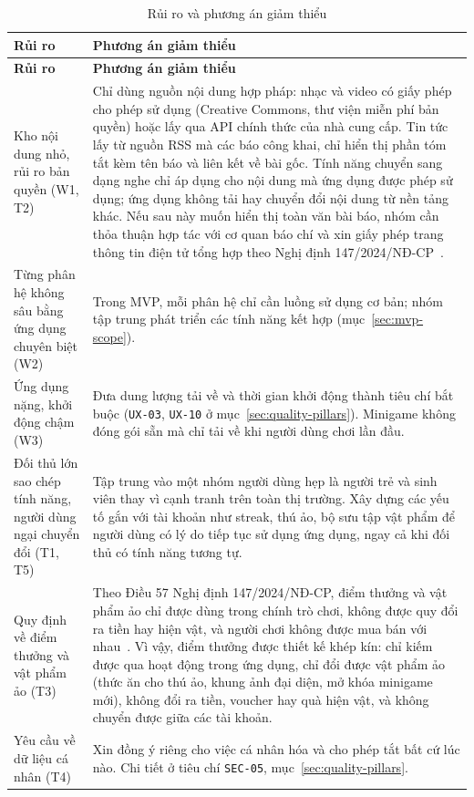 \begingroup
\small
\begin{longtable}{@{}>{\raggedright\arraybackslash}p{4.2cm}>{\raggedright\arraybackslash}p{11.2cm}@{}}
\caption{Rủi ro và phương án giảm thiểu}
\label{tab:swot-risks} \\
\toprule
\textbf{Rủi ro} & \textbf{Phương án giảm thiểu} \\
\midrule
\endfirsthead
\toprule
\textbf{Rủi ro} & \textbf{Phương án giảm thiểu} \\
\midrule
\endhead
\bottomrule
\endfoot
Kho nội dung nhỏ, rủi ro bản quyền (W1, T2) &
Chỉ dùng nguồn nội dung hợp pháp: nhạc và video có giấy phép cho phép sử dụng (Creative Commons, thư viện miễn phí bản quyền) hoặc lấy qua API chính thức của nhà cung cấp. Tin tức lấy từ nguồn RSS mà các báo công khai, chỉ hiển thị phần tóm tắt kèm tên báo và liên kết về bài gốc. Tính năng chuyển sang dạng nghe chỉ áp dụng cho nội dung mà ứng dụng được phép sử dụng; ứng dụng không tải hay chuyển đổi nội dung từ nền tảng khác. Nếu sau này muốn hiển thị toàn văn bài báo, nhóm cần thỏa thuận hợp tác với cơ quan báo chí và xin giấy phép trang thông tin điện tử tổng hợp theo Nghị định 147/2024/NĐ-CP~\cite{nd147-2024}. \\
\midrule
Từng phân hệ không sâu bằng ứng dụng chuyên biệt (W2) &
Trong MVP, mỗi phân hệ chỉ cần luồng sử dụng cơ bản; nhóm tập trung phát triển các tính năng kết hợp (mục~\ref{sec:mvp-scope}). \\
\midrule
Ứng dụng nặng, khởi động chậm (W3) &
Đưa dung lượng tải về và thời gian khởi động thành tiêu chí bắt buộc (\texttt{UX-03}, \texttt{UX-10} ở mục~\ref{sec:quality-pillars}). Minigame không đóng gói sẵn mà chỉ tải về khi người dùng chơi lần đầu. \\
\midrule
Đối thủ lớn sao chép tính năng, người dùng ngại chuyển đổi (T1, T5) &
Tập trung vào một nhóm người dùng hẹp là người trẻ và sinh viên thay vì cạnh tranh trên toàn thị trường. Xây dựng các yếu tố gắn với tài khoản như streak, thú ảo, bộ sưu tập vật phẩm để người dùng có lý do tiếp tục sử dụng ứng dụng, ngay cả khi đối thủ có tính năng tương tự. \\
\midrule
Quy định về điểm thưởng và vật phẩm ảo (T3) &
Theo Điều 57 Nghị định 147/2024/NĐ-CP, điểm thưởng và vật phẩm ảo chỉ được dùng trong chính trò chơi, không được quy đổi ra tiền hay hiện vật, và người chơi không được mua bán với nhau~\cite{nd147-2024}. Vì vậy, điểm thưởng được thiết kế khép kín: chỉ kiếm được qua hoạt động trong ứng dụng, chỉ đổi được vật phẩm ảo (thức ăn cho thú ảo, khung ảnh đại diện, mở khóa minigame mới), không đổi ra tiền, voucher hay quà hiện vật, và không chuyển được giữa các tài khoản. \\
\midrule
Yêu cầu về dữ liệu cá nhân (T4) &
Xin đồng ý riêng cho việc cá nhân hóa và cho phép tắt bất cứ lúc nào. Chi tiết ở tiêu chí \texttt{SEC-05}, mục~\ref{sec:quality-pillars}. \\
\end{longtable}
\endgroup